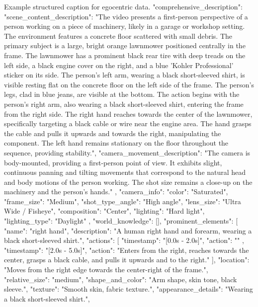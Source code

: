 \begin{captionexample}{Example structured caption for egocentric data.}
{
  "comprehensive_description": {
    "scene_content_description": "The video presents a first-person perspective of a person working on a piece of machinery, likely in a garage or workshop setting. The environment features a concrete floor scattered with small debris. The primary subject is a large, bright orange lawnmower positioned centrally in the frame. The lawnmower has a prominent black rear tire with deep treads on the left side, a black engine cover on the right, and a blue 'Kohler Professional' sticker on its side. The person's left arm, wearing a black short-sleeved shirt, is visible resting flat on the concrete floor on the left side of the frame. The person's legs, clad in blue jeans, are visible at the bottom. The action begins with the person's right arm, also wearing a black short-sleeved shirt, entering the frame from the right side. The right hand reaches towards the center of the lawnmower, specifically targeting a black cable or wire near the engine area. The hand grasps the cable and pulls it upwards and towards the right, manipulating the component. The left hand remains stationary on the floor throughout the sequence, providing stability.",
    "camera_movement_description": "The camera is body-mounted, providing a first-person point of view. It exhibits slight, continuous panning and tilting movements that correspond to the natural head and body motions of the person working. The shot size remains a close-up on the machinery and the person's hands."
  },
  "camera_info": {
    "color": "Saturated",
    "frame_size": "Medium",
    "shot_type_angle": "High angle",
    "lens_size": "Ultra Wide / Fisheye",
    "composition": "Center",
    "lighting": "Hard light",
    "lighting_type": "Daylight"
  },
  "world_knowledge": [],
  "prominent_elements": [
    {
      "name": "right hand",
      "description": "A human right hand and forearm, wearing a black short-sleeved shirt.",
      "actions": [
        {
          "timestamp": "[0.0s - 2.0s]",
          "action": ""
        },
        {
          "timestamp": "[2.0s - 5.0s]",
          "action": "Enters from the right, reaches towards the center, grasps a black cable, and pulls it upwards and to the right."
        }
      ],
      "location": "Moves from the right edge towards the center-right of the frame.",
      "relative_size": "medium",
      "shape_and_color": "Arm shape, skin tone, black sleeve.",
      "texture": "Smooth skin, fabric texture.",
      "appearance_details": "Wearing a black short-sleeved shirt.",
}}
\end{captionexample}
